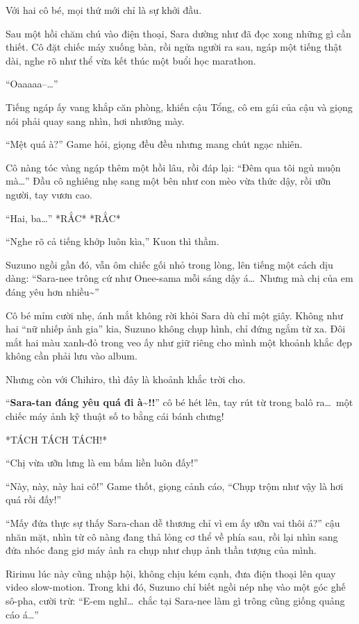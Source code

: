 \documentclass[../main.tex]{subfiles}
\begin{document}
Với hai cô bé, mọi thứ mới chỉ là sự khởi đầu.

\ct

Sau một hồi chăm chú vào điện thoại, Sara dường như đã đọc xong những gì cần thiết. Cô đặt chiếc máy xuống bàn, rồi ngửa người ra sau, ngáp một tiếng thật dài, nghe rõ như thể vừa kết thúc một buổi học marathon.

``Oaaaaa--\dots''

Tiếng ngáp ấy vang khắp căn phòng, khiến cậu Tổng, cô em gái của cậu và giọng nói phải quay sang nhìn, hơi nhướng mày.

``Mệt quá à?'' Game hỏi, giọng đều đều nhưng mang chút ngạc nhiên.

Cô nàng tóc vàng ngáp thêm một hồi lâu, rồi đáp lại: ``Đêm qua tôi ngủ muộn mà\dots'' Đầu cô nghiêng nhẹ sang một bên như con mèo vừa thức dậy, rồi ưỡn người, tay vươn cao.

``Hai, ba\dots'' *RẮC* *RẮC*


``Nghe rõ cả tiếng khớp luôn kìa,'' Kuon thì thầm.

Suzuno ngồi gần đó, vẫn ôm chiếc gối nhỏ trong lòng, lên tiếng một cách dịu dàng: ``Sara-nee trông cứ như Onee-sama mỗi sáng dậy á\dots\ Nhưng mà chị của em đáng yêu hơn nhiều\~{}''

Cô bé mỉm cười nhẹ, ánh mắt không rời khỏi Sara dù chỉ một giây. Không như hai ``nữ nhiếp ảnh gia'' kia, Suzuno không chụp hình, chỉ đứng ngắm từ xa. Đôi mắt hai màu xanh-đỏ trong veo ấy như giữ riêng cho mình một khoảnh khắc đẹp không cần phải lưu vào album.

Nhưng còn với Chihiro, thì đây là khoảnh khắc trời cho.

``\textbf{Sara-tan đáng yêu quá đi à\~{}!!}'' cô bé hét lên, tay rút từ trong balô ra\dots\ một chiếc máy ảnh kỹ thuật số to bằng cái bánh chưng!

*TÁCH TÁCH TÁCH!*

``Chị vừa ưỡn lưng là em bấm liền luôn đấy!''

``Này, này, này hai cô!'' Game thốt, giọng cảnh cáo, ``Chụp trộm như vậy là hơi quá rồi đấy!''

``Mấy đứa thực sự thấy Sara-chan dễ thương chỉ vì em ấy ưỡn vai thôi á?'' cậu nhăn mặt, nhìn từ cô nàng đang thả lỏng cơ thể về phía sau, rồi lại nhìn sang đứa nhóc đang giơ máy ảnh ra chụp như chụp ảnh thần tượng của mình.

Ririmu lúc này cũng nhập hội, không chịu kém cạnh, đưa điện thoại lên quay video slow-motion. Trong khi đó, Suzuno chỉ biết ngồi nép nhẹ vào một góc ghế sô-pha, cười trừ: ``E-em nghĩ\dots\ chắc tại Sara-nee làm gì trông cũng giống quảng cáo á\dots''
\end{document}
